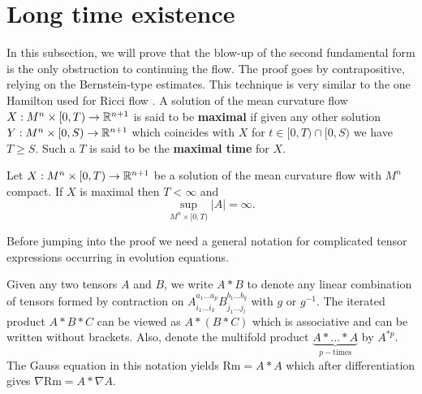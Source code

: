 \section{Long time existence}\label{Longtime}

In this subsection, we will prove that the blow-up of the second fundamental form is the only obstruction to continuing the flow. The proof goes by contrapositive, relying on the Bernstein-type estimates. This technique is very similar to the one Hamilton used for Ricci flow \cite{hamilton1982three}. A solution of the mean curvature flow $ X : M^{n} \times [0,T) \to \mathbb{R}^{n+1} $ is said to be \textbf{maximal}  if given any other solution $ Y : M^{n} \times [0,S) \to \mathbb{R}^{n+1} $ which coincides with $ X $ for $ t \in [0,T) \cap [0,S) $ we have $ T \ge S $. Such a $ T $ is said to be the \textbf{maximal time} for $ X $. 

\begin{thm}\label{longtimeexistence}
    Let $ X: M^{n} \times [0, T) \to \mathbb{R}^{n+1} $ be a solution of the mean curvature flow with $ M^{n} $ compact. If $ X $ is maximal then $ T< \infty $ and 
    \[ \sup_{M^{n} \times [0,T)} |A| = \infty.\]
\end{thm}

Before jumping into the proof we need a general notation for complicated tensor expressions occurring in evolution equations. 
\begin{defn}
    Given any two tensors $ A $ and $ B $, we write $ A * B $ to denote any linear combination of tensors formed by contraction on $ A_{i_{1} \dots i_{k}}^{a_{1} \dots a_{p}}B_{j_{1} \dots j_{l}}^{b_{1} \dots b_{q}} $ with $ g $ or $ g^{-1} $. The iterated product $ A * B * C $ can be viewed as $ A * (B * C) $ which is associative and can be written without brackets. Also, denote the multifold product $ \underbrace{A * \dots * A}_{p-\text{times}}$ by $ A^{*p} $. The Gauss equation in this notation yields $ \text{Rm} = A * A $ which after differentiation gives $ \nabla \text{Rm} = A * \nabla A $. 
\end{defn}

